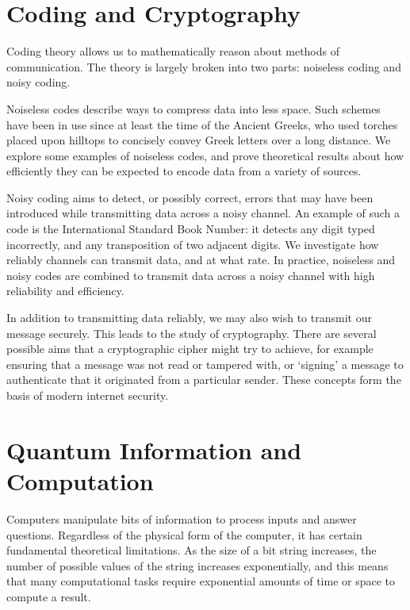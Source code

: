 

\chapter{Coding and Cryptography}
Coding theory allows us to mathematically reason about methods of communication.
The theory is largely broken into two parts: noiseless coding and noisy coding.

Noiseless codes describe ways to compress data into less space.
Such schemes have been in use since at least the time of the Ancient Greeks, who used torches placed upon hilltops to concisely convey Greek letters over a long distance.
We explore some examples of noiseless codes, and prove theoretical results about how efficiently they can be expected to encode data from a variety of sources.

Noisy coding aims to detect, or possibly correct, errors that may have been introduced while transmitting data across a noisy channel.
An example of such a code is the International Standard Book Number: it detects any digit typed incorrectly, and any transposition of two adjacent digits.
We investigate how reliably channels can transmit data, and at what rate.
In practice, noiseless and noisy codes are combined to transmit data across a noisy channel with high reliability and efficiency.

In addition to transmitting data reliably, we may also wish to transmit our message securely.
This leads to the study of cryptography.
There are several possible aims that a cryptographic cipher might try to achieve, for example ensuring that a message was not read or tampered with, or `signing' a message to authenticate that it originated from a particular sender.
These concepts form the basis of modern internet security.



\chapter{Quantum Information and Computation}
Computers manipulate bits of information to process inputs and answer questions.
Regardless of the physical form of the computer, it has certain fundamental theoretical limitations.
As the size of a bit string increases, the number of possible values of the string increases exponentially, and this means that many computational tasks require exponential amounts of time or space to compute a result.

